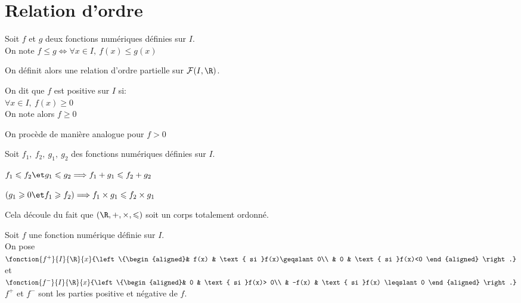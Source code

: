 \documentclass[12pt,twoside,a4paper]{article}
\begin{document}
	\section{Relation d'ordre}
		\begin{defi}
			Soit $f$ et $g$ deux fonctions num\'eriques d\'efinies sur $I$.\\
			On note $f \leqslant g \iff \forall x \in I,\ f(x) \leqslant g(x)$
		\end{defi}
		\begin{flushleft}
			On d\'efinit alors une relation d'ordre partielle sur $\mathcal{F}(I,\R)$.
		\end{flushleft}
		\begin{defi}
			\begin{liste}
				\item On dit que $f$ est positive sur $I$ si:\\
					$\forall x\in I,\ f(x) \geqslant 0$\\
					On note alors $f\geqslant 0$
				\item On proc\`ede de mani\`ere analogue pour $f>0$
			\end{liste}
		\end{defi}
		\begin{prop}
			Soit $f_1,\ f_2,\ g_1,\ g_2$ des fonctions num\'eriques d\'efinies sur $I$.
			\begin{liste}
				\item $f_1 \leqslant f_2 \et g_1 \leqslant g_2 \Longrightarrow f_1+g_1 \leqslant f_2 + g_2$
				\item $\left(g_1\geqslant 0 \et f_1 \geqslant f_2 \right) \Longrightarrow f_1 \times g_1 \leqslant f_2 \times g_1$
			\end{liste}
		\end{prop}
		\begin{preuve}
			Cela d\'ecoule du fait que $(\R,+,\times,\leqslant)$ soit un corps totalement ordonn\'e.
		\end{preuve}
		\begin{defi}
			Soit $f$ une fonction num\'erique d\'efinie sur $I$.\\
			On pose $\fonction{f^{+}}{I}{\R}{x}{\left\{\begin{aligned}& f(x) & \text{ si }f(x)\geqslant 0\\	& 0 & \text{ si }f(x)<0	\end{aligned} \right.}$ et $\fonction{f^{-}}{I}{\R}{x}{\left\{\begin{aligned}& 0 & \text{ si }f(x)> 0\\	& -f(x) & \text{ si }f(x) \leqslant 0	\end{aligned} \right.}$\\
			$f^{+}$ et $f^{-}$ sont les parties positive et n\'egative de $f$.
		\end{defi}
\end{document}
